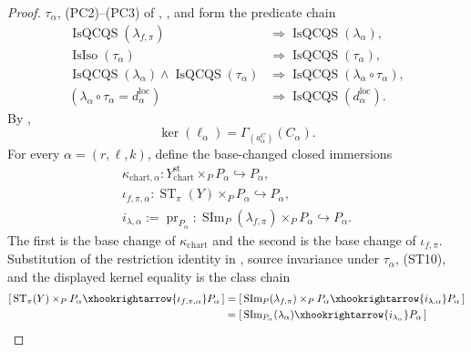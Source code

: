 \begin{proof}
  $\tau_\alpha$, (PC2)--(PC3) of
  ,
  , and
   form the predicate chain
  \[
  \begin{aligned}
    \operatorname{IsQCQS}(\lambda_{f,\pi})
      &\Longrightarrow\operatorname{IsQCQS}(\lambda_\alpha),\\
    \operatorname{IsIso}(\tau_\alpha)
      &\Longrightarrow\operatorname{IsQCQS}(\tau_\alpha),\\
    \operatorname{IsQCQS}(\lambda_\alpha)\wedge
      \operatorname{IsQCQS}(\tau_\alpha)
      &\Longrightarrow
        \operatorname{IsQCQS}(\lambda_\alpha\circ\tau_\alpha),\\
    (\lambda_\alpha\circ\tau_\alpha=d^{\mathrm{loc}}_\alpha)
      &\Longrightarrow\operatorname{IsQCQS}(d^{\mathrm{loc}}_\alpha).
  \end{aligned}                                                     \tag{ST10a}
  \]
  By ,
  \[
    \ker(\ell_\alpha)
      =\Gamma_{(a^C_\alpha)}(C_\alpha).
  \]
  For every $\alpha=(r,\ell,k)$, define the base-changed closed immersions
  \[
  \begin{gathered}
    \kappa_{\mathrm{chart},\alpha}\colon
      Y^{\mathrm{st}}_{\mathrm{chart}}\times_PP_\alpha
        \hookrightarrow P_\alpha,\\
    \iota_{f,\pi,\alpha}\colon
      \operatorname{ST}_\pi(Y)\times_PP_\alpha
        \hookrightarrow P_\alpha,\\
    i_{\lambda,\alpha}:=\operatorname{pr}_{P_\alpha}\colon
      \operatorname{SIm}_P(\lambda_{f,\pi})\times_PP_\alpha
        \hookrightarrow P_\alpha.
  \end{gathered}
  \]
  The first is the base change of $\kappa_{\mathrm{chart}}$ and the second
  is the base change of $\iota_{f,\pi}$.  Substitution of the restriction
  identity in , source
  invariance under $\tau_\alpha$, (ST10), and the displayed kernel equality
  is the class chain
  \[
  \begin{aligned}
    [\,\operatorname{ST}_\pi(Y)\times_PP_\alpha
      \xhookrightarrow{\iota_{f,\pi,\alpha}}P_\alpha\,]
      &=[\,\operatorname{SIm}_P(\lambda_{f,\pi})\times_PP_\alpha
        \xhookrightarrow{i_{\lambda,\alpha}}P_\alpha\,]\\
      &=[\,\operatorname{SIm}_{P_\alpha}(\lambda_\alpha)
        \xhookrightarrow{i_{\lambda_\alpha}}P_\alpha\,]\\

\end{aligned}\]
\end{proof}
